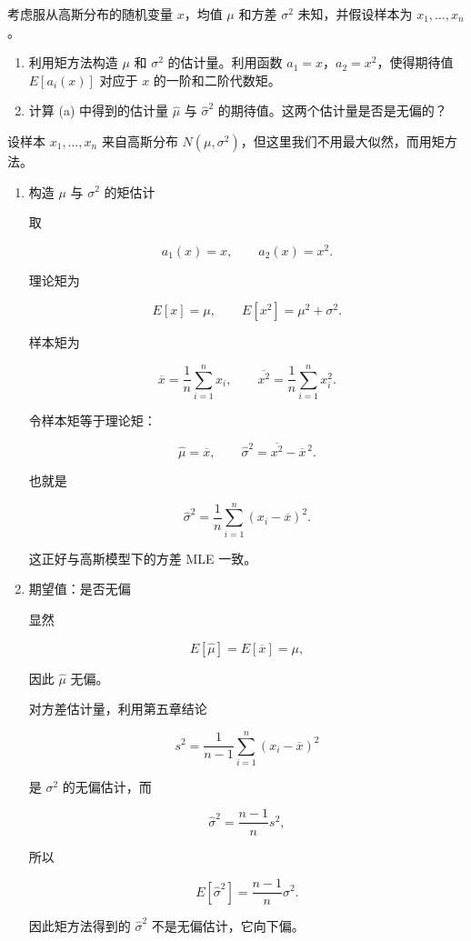 ﻿


\begin{question}
考虑服从高斯分布的随机变量 \(x\)，均值 \(\mu\) 和方差 \(\sigma^2\)
未知，并假设样本为 \(x_1,\ldots,x_n\)。

\begin{enumerate}
\item
  利用矩方法构造 \(\mu\) 和 \(\sigma^2\) 的估计量。利用函数
  \(a_1=x\)，\(a_2=x^2\)，使得期待值 \(E[a_i(x)]\) 对应于 \(x\)
  的一阶和二阶代数矩。
\item
  计算 (a) 中得到的估计量 \(\hat\mu\) 与 \(\hat\sigma^2\)
  的期待值。这两个估计量是否是无偏的？
\end{enumerate}
\begin{solution}
设样本 \(x_1,\dots,x_n\) 来自高斯分布
\(N(\mu,\sigma^2)\)，但这里我们不用最大似然，而用矩方法。

\begin{enumerate}
\item 构造 \(\mu\) 与 \(\sigma^2\) 的矩估计

取

\[
a_1(x)=x,
\qquad
a_2(x)=x^2.
\]

理论矩为

\[
E[x]=\mu,
\qquad E[x^2]=\mu^2+\sigma^2.
\]

样本矩为

\[
\overline x=\frac1n\sum_{i=1}^n x_i,
\qquad
\overline{x^2}=\frac1n\sum_{i=1}^n x_i^2.
\]

令样本矩等于理论矩：

\[
\hat\mu=\overline x,
\qquad
\hat\sigma^2=\overline{x^2}-\overline x^{\,2}.
\]

也就是

\[
\hat\sigma^2=\frac1n\sum_{i=1}^n (x_i-\overline x)^2.
\]

这正好与高斯模型下的方差 MLE 一致。

\item 期望值：是否无偏

显然

\[
E[\hat\mu]=E[\overline x]=\mu,
\]

因此 \(\hat\mu\) 无偏。

对方差估计量，利用第五章结论

\[
s^2=\frac1{n-1}\sum_{i=1}^n (x_i-\overline x)^2
\]

是 \(\sigma^2\) 的无偏估计，而

\[
\hat\sigma^2=\frac{n-1}{n}s^2,
\]

所以

\[
E[\hat\sigma^2]=\frac{n-1}{n}\sigma^2.
\]

因此矩方法得到的 \(\hat\sigma^2\) 不是无偏估计，它向下偏。
\end{enumerate}
\end{solution}
\end{question}


